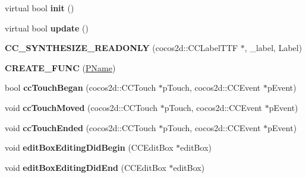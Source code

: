 \begin{DoxyCompactItemize}
\item 
\hypertarget{class_p_name_aae3484ba9d5c4063b4749d8783b55e26}{virtual bool {\bfseries init} ()}\label{class_p_name_aae3484ba9d5c4063b4749d8783b55e26}

\item 
\hypertarget{class_p_name_ad7270cfbaf4646b1efa423a46ab88e95}{virtual bool {\bfseries update} ()}\label{class_p_name_ad7270cfbaf4646b1efa423a46ab88e95}

\item 
\hypertarget{class_p_name_a54593f5bb2c673c05e1816f160bcbe5a}{{\bfseries C\-C\-\_\-\-S\-Y\-N\-T\-H\-E\-S\-I\-Z\-E\-\_\-\-R\-E\-A\-D\-O\-N\-L\-Y} (cocos2d\-::\-C\-C\-Label\-T\-T\-F $\ast$, \-\_\-label, Label)}\label{class_p_name_a54593f5bb2c673c05e1816f160bcbe5a}

\item 
\hypertarget{class_p_name_af67f9098d77bab6f025ac46909fe0df5}{{\bfseries C\-R\-E\-A\-T\-E\-\_\-\-F\-U\-N\-C} (\hyperlink{class_p_name}{P\-Name})}\label{class_p_name_af67f9098d77bab6f025ac46909fe0df5}

\item 
\hypertarget{class_p_name_afba1fed5f3b308556abbc4513c8a8949}{bool {\bfseries cc\-Touch\-Began} (cocos2d\-::\-C\-C\-Touch $\ast$p\-Touch, cocos2d\-::\-C\-C\-Event $\ast$p\-Event)}\label{class_p_name_afba1fed5f3b308556abbc4513c8a8949}

\item 
\hypertarget{class_p_name_a667a06616ba81bb2b2facc1b3f007ef3}{void {\bfseries cc\-Touch\-Moved} (cocos2d\-::\-C\-C\-Touch $\ast$p\-Touch, cocos2d\-::\-C\-C\-Event $\ast$p\-Event)}\label{class_p_name_a667a06616ba81bb2b2facc1b3f007ef3}

\item 
\hypertarget{class_p_name_a3ab7f6e8616d606a3a3d36bdac9ce5e4}{void {\bfseries cc\-Touch\-Ended} (cocos2d\-::\-C\-C\-Touch $\ast$p\-Touch, cocos2d\-::\-C\-C\-Event $\ast$p\-Event)}\label{class_p_name_a3ab7f6e8616d606a3a3d36bdac9ce5e4}

\item 
\hypertarget{class_p_name_a637d1f4137ee1db722fc2b672327fd83}{void {\bfseries edit\-Box\-Editing\-Did\-Begin} (C\-C\-Edit\-Box $\ast$edit\-Box)}\label{class_p_name_a637d1f4137ee1db722fc2b672327fd83}

\item 
\hypertarget{class_p_name_a758b976bd33f7817452ed9446ba12d4e}{void {\bfseries edit\-Box\-Editing\-Did\-End} (C\-C\-Edit\-Box $\ast$edit\-Box)}\label{class_p_name_a758b976bd33f7817452ed9446ba12d4e}


\end{DoxyCompactItemize}
